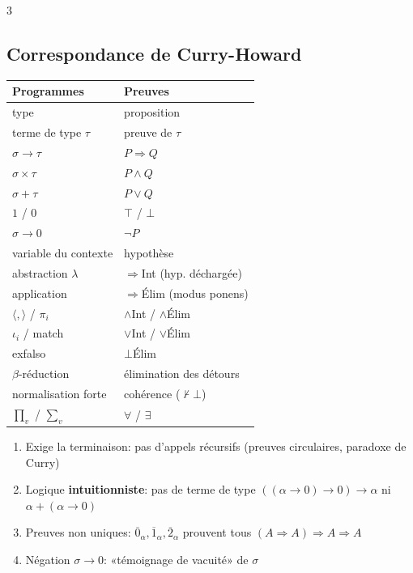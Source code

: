 \documentclass[12pt, a4paper]{article}
\newcommand{\inj}[1]{\iota_{#1}}
\begin{document}
\begin{multicols*}{3}
	\subsection{Correspondance de Curry-Howard}
	\begin{tabular}{|l|l|}
		\hline
		\textbf{Programmes}            & \textbf{Preuves}             \\
		\hline
		type                           & proposition                  \\
		terme de type $\tau$           & preuve de $\tau$             \\
		$\sigma\to\tau$                & $P\Rightarrow Q$             \\
		$\sigma\times\tau$             & $P\wedge Q$                  \\
		$\sigma+\tau$                  & $P\vee Q$                    \\
		$1$ / $0$                      & $\top$ / $\bot$              \\
		$\sigma\to0$                   & $\neg P$                     \\
		variable du contexte           & hypothèse                    \\
		abstraction $\lambda$          & $\Rightarrow$Int (hyp. déchargée) \\
		application                    & $\Rightarrow$Élim (modus ponens) \\
		$\langle,\rangle$ / $\pi_i$    & $\wedge$Int / $\wedge$Élim   \\
		$\inj i$ / match               & $\vee$Int / $\vee$Élim       \\
		exfalso                        & $\bot$Élim                   \\
		$\beta$-réduction              & élimination des détours      \\
		normalisation forte            & cohérence ($\nvdash\bot$)    \\
		$\prod_v$ / $\sum_v$           & $\forall$ / $\exists$        \\
		\hline
	\end{tabular}
	\begin{enumerate}[\roman*.]
		\item Exige la terminaison: pas d'appels récursifs (preuves circulaires, paradoxe de Curry)
		\item Logique \textbf{intuitionniste}: pas de terme de type $((\alpha\to0)\to0)\to\alpha$ ni $\alpha+(\alpha\to0)$
		\item Preuves non uniques: $\overline0_\alpha,\overline1_\alpha,\overline2_\alpha$ prouvent tous $(A\Rightarrow A)\Rightarrow A\Rightarrow A$
		\item Négation $\sigma\to0$: «témoignage de vacuité» de $\sigma$
	\end{enumerate}


\end{multicols*}
\end{document}
